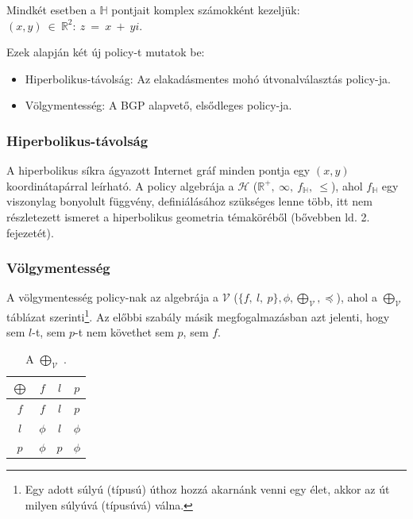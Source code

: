   Mindkét esetben a $\mathbb{H}$ pontjait komplex számokként kezeljük: $(x,y)~\in~\mathbb{R}^2:~z~=~x~+~yi$.

  Ezek alapján két új policy-t mutatok be:

  \begin{itemize}
    \item Hiperbolikus-távolság: Az elakadásmentes mohó útvonalválasztás policy-ja.
    \item Völgymentesség: A BGP alapvető, elsődleges policy-ja.
  \end{itemize}

      \subsubsection{Hiperbolikus-távolság}

      A hiperbolikus síkra ágyazott Internet gráf minden pontja egy $(x,y)$ koordinátapárral leírható. A policy algebrája a $\mathcal{H}$ ($\mathbb{R}^{+},~\infty,~f_{\mathbb{H}},~\leq$), ahol $f_{\mathbb{H}}$ egy viszonylag bonyolult függvény, definiálásához szükséges lenne több, itt nem részletezett ismeret a hiperbolikus geometria témaköréből (bővebben ld. \cite{Thurston97} 2. fejezetét).

      \subsubsection{Völgymentesség}

      A völgymentesség policy-nak az algebrája a $\mathcal{V}$ ($\{f,~l,~p\},\phi,\bigoplus_{\mathcal{V}},\preceq$),  ahol a $\bigoplus_{\mathcal{V}}$  táblázat szerinti\footnote{ Egy adott súlyú (típusú) úthoz hozzá akarnánk venni egy élet, akkor az út milyen súlyúvá (típusúvá) válna.}. Az előbbi szabály másik megfogalmazásban azt jelenti, hogy sem $l$-t, sem $p$-t nem követhet sem $p$, sem $f$.

      \begin{table}[ht]
        \footnotesize
        \centering
        \caption{A $\bigoplus_{\mathcal{V}}$ \cite{Compact_Policy_Routing}.}
        \begin{tabular}{ c | c c c }
          $\bigoplus$ & $f$ & $l$ & $p$\\
          \hline
          $f$ & $f$ & $l$ & $p$\\
          $l$ & $\phi$ & $l$ & $\phi$\\
          $p$ & $\phi$ & $p$ & $\phi$\\
        \end{tabular}\label{tab:szumma_tab}
      \end{table}\newpage

